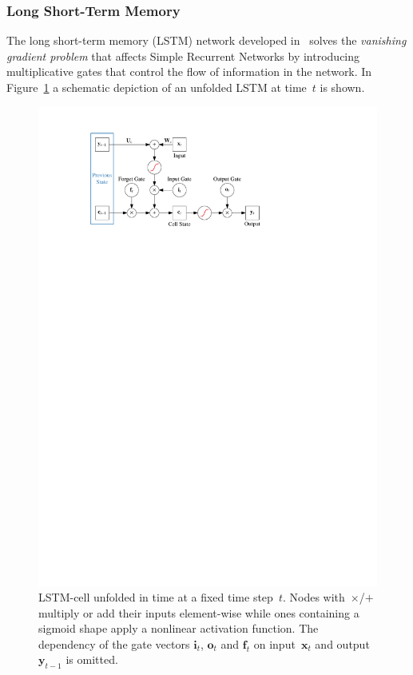\subsubsection{Long Short-Term Memory}
\label{sec:lstm}
The long short-term memory (LSTM) network developed in~\cite{lstm} solves the
\emph{vanishing gradient problem} that affects Simple Recurrent Networks by
introducing multiplicative gates that control the flow of information in the
network. In Figure~\ref{fig:schematic_lstm} a schematic depiction of an unfolded
LSTM at time~$t$ is shown.
\begin{figure}[htb]
  \centering
  \includegraphics{./figures/theory/LSTM.pdf}
  \caption{LSTM-cell unfolded in time at a fixed time step~$t$. Nodes
    with~$\times$/$+$ multiply or add their inputs element-wise while ones
    containing a sigmoid shape apply a nonlinear activation function. The
    dependency of the gate vectors $\mathbf{i}_t$, $\mathbf{o}_t$ and
    $\mathbf{f}_t$ on input~$\mathbf{x}_t$ and output~$\mathbf{y}_{t-1}$ is
    omitted.}
  \label{fig:schematic_lstm}
\end{figure}

